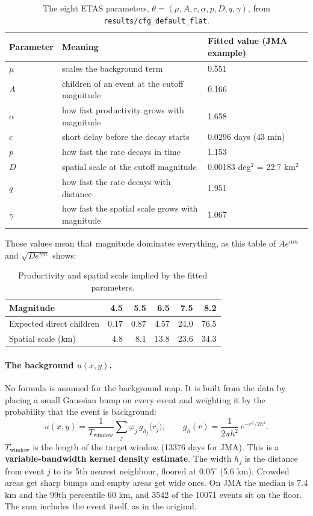 \documentclass[11pt,a4paper]{article}
\newcommand{\code}[1]{\texttt{#1}}
\begin{document}
\begin{table}[H]
\centering\small
\begin{tabular}{@{}lll@{}}
\toprule
Parameter & Meaning & Fitted value (JMA example) \\
\midrule
$\mu$ & scales the background term & 0.551 \\
$A$ & children of an event at the cutoff magnitude & 0.166 \\
$\alpha$ & how fast productivity grows with magnitude & 1.658 \\
$c$ & short delay before the decay starts & 0.0296 days (43 min) \\
$p$ & how fast the rate decays in time & 1.153 \\
$D$ & spatial scale at the cutoff magnitude & 0.00183 deg$^2$ = 22.7 km$^2$ \\
$q$ & how fast the rate decays with distance & 1.951 \\
$\gamma$ & how fast the spatial scale grows with magnitude & 1.067 \\
\bottomrule
\end{tabular}
\caption{The eight ETAS parameters, $\theta = (\mu,A,c,\alpha,p,D,q,\gamma)$, from \code{results/cfg\_default\_flat}.}
\end{table}

Those values mean that magnitude dominates everything, as this table of $A e^{\alpha m}$ and
$\sqrt{D e^{\gamma m}}$ shows:

\begin{table}[H]
\centering\small
\begin{tabular}{@{}lrrrrr@{}}
\toprule
Magnitude & 4.5 & 5.5 & 6.5 & 7.5 & 8.2 \\
\midrule
Expected direct children & 0.17 & 0.87 & 4.57 & 24.0 & 76.5 \\
Spatial scale (km) & 4.8 & 8.1 & 13.8 & 23.6 & 34.3 \\
\bottomrule
\end{tabular}
\caption{Productivity and spatial scale implied by the fitted parameters.}
\end{table}

\paragraph{The background $u(x,y)$.}
No formula is assumed for the background map. It is built from the data by placing a small
Gaussian bump on every event and weighting it by the probability that the event is background:
\begin{equation}
  u(x,y) = \frac{1}{T_{\text{window}}}\sum_j \varphi_j \, g_{h_j}\!\bigl(r_j\bigr),
  \qquad g_h(r) = \frac{1}{2\pi h^2}\,e^{-r^2/2h^2}.
  \label{eq:u}
\end{equation}
$T_{\text{window}}$ is the length of the target window (13376 days for JMA). This is a \textbf{variable-bandwidth kernel density estimate}. The width $h_j$ is the distance from
event $j$ to its 5th nearest neighbour, floored at $0.05^\circ$ (5.6 km). Crowded areas get sharp
bumps and empty areas get wide ones. On JMA the median is 7.4 km and the 99th percentile 60 km,
and 3542 of the 10071 events sit on the floor. The sum includes the event itself, as in the original.
\end{document}
